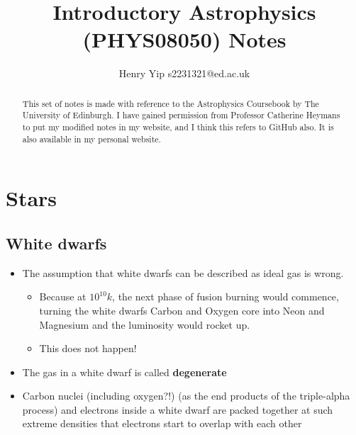 \documentclass{article}
\title{Introductory Astrophysics (PHYS08050) Notes}
\author{Henry Yip
s2231321@ed.ac.uk
}
\begin{document}
\maketitle
\begin{abstract}
This set of notes is made with reference to the Astrophysics Coursebook by The University of Edinburgh. I have gained permission from Professor Catherine Heymans to put my modified notes in my website, and I think this refers to GitHub also. It is also available in my personal website.
\end{abstract}
\section{Stars}
\subsection{White dwarfs}
\begin{itemize}
    \item The assumption that white dwarfs can be described as ideal gas is wrong.
    \begin{itemize}
        \item Because at $10^{10}k$, the next phase of fusion burning would commence, turning the white dwarfs Carbon and Oxygen core into Neon and Magnesium and the luminosity would rocket up.
       \item This does not happen!
    \end{itemize}
    \item  The gas in a white dwarf is called 
    \textbf{degenerate}
    \item Carbon nuclei (including oxygen?!) (as the end products of the triple-alpha process) and electrons inside a white dwarf are packed together at such extreme densities that electrons start to overlap with each other
\end{itemize}
\end{document}
